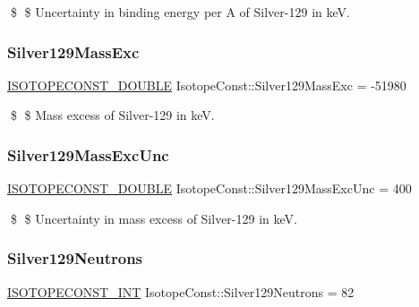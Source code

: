 \$ \$ Uncertainty in binding energy per A of Silver-\/129 in keV. \mbox{\label{group___isotope_const-_silver-_ag129_gae6b6d4a7254ee4c1d663635318195e8f}} 
\subsubsection{\texorpdfstring{Silver129\+Mass\+Exc}{Silver129MassExc}}
{\footnotesize\ttfamily \mbox{\hyperlink{group___isotope_const-_macros_ga8f45a7272ce02c0b4c65c44636ed719a}{I\+S\+O\+T\+O\+P\+E\+C\+O\+N\+S\+T\+\_\+\+D\+O\+U\+B\+LE}} Isotope\+Const\+::\+Silver129\+Mass\+Exc = -\/51980}

\$ \$ Mass excess of Silver-\/129 in keV. \mbox{\label{group___isotope_const-_silver-_ag129_gacaee3e06f38867e6f89c9ea45b7d13e0}} 
\subsubsection{\texorpdfstring{Silver129\+Mass\+Exc\+Unc}{Silver129MassExcUnc}}
{\footnotesize\ttfamily \mbox{\hyperlink{group___isotope_const-_macros_ga8f45a7272ce02c0b4c65c44636ed719a}{I\+S\+O\+T\+O\+P\+E\+C\+O\+N\+S\+T\+\_\+\+D\+O\+U\+B\+LE}} Isotope\+Const\+::\+Silver129\+Mass\+Exc\+Unc = 400}

\$ \$ Uncertainty in mass excess of Silver-\/129 in keV. \mbox{\label{group___isotope_const-_silver-_ag129_gaa676c8ac1a73f7e9466d5d29a5462faf}} 
\subsubsection{\texorpdfstring{Silver129\+Neutrons}{Silver129Neutrons}}
{\footnotesize\ttfamily \mbox{\hyperlink{group___isotope_const-_macros_ga5f18360b3e99483a35c32d789e62621c}{I\+S\+O\+T\+O\+P\+E\+C\+O\+N\+S\+T\+\_\+\+I\+NT}} Isotope\+Const\+::\+Silver129\+Neutrons = 82}

